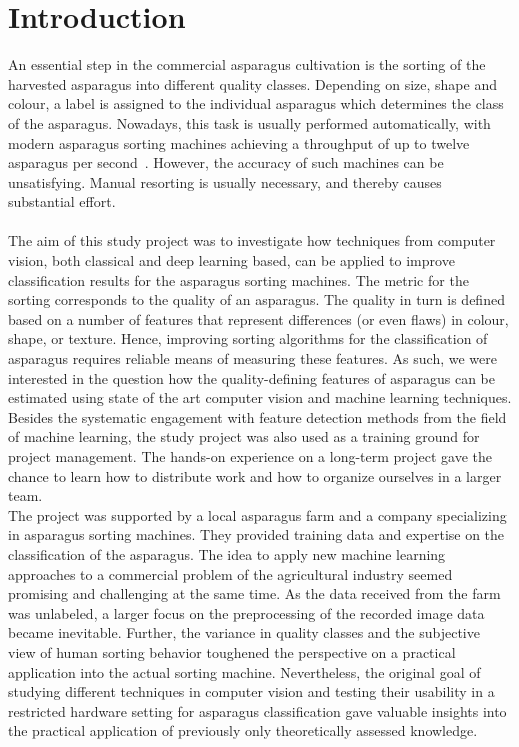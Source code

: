 \section{Introduction}
\label{ch:Introduction}

An essential step in the commercial asparagus cultivation is the sorting of the harvested asparagus into different quality classes. Depending on size, shape and colour, a label is assigned to the individual asparagus which determines the class of the asparagus. Nowadays, this task is usually performed automatically, with modern asparagus sorting machines achieving a throughput of up to twelve asparagus per second~\citep{ting2015zeitalter}. However, the accuracy of such machines can be unsatisfying. Manual resorting is usually necessary, and thereby causes substantial effort. \\
\\
The aim of this study project was to investigate how techniques from computer vision, both classical and deep learning based, can be applied to improve classification results for the asparagus sorting machines. The metric for the sorting corresponds to the quality of an asparagus. The quality in turn is defined based on a number of features that represent differences (or even flaws) in colour, shape, or texture. Hence, improving sorting algorithms for the classification of asparagus requires reliable means of measuring these features. As such, we were interested in the question how the quality-defining features of asparagus can be estimated using state of the art computer vision and machine learning techniques. \\
Besides the systematic engagement with feature detection methods from the field of machine learning, the study project was also used as a training ground for project management. The hands-on experience on a long-term project gave the chance to learn how to distribute work and how to organize ourselves in a larger team. \\
The project was supported by a local asparagus farm and a company specializing in asparagus sorting machines. They provided training data and expertise on the classification of the asparagus. The idea to apply new machine learning approaches to a commercial problem of the agricultural industry seemed promising and challenging at the same time. As the data received from the farm was unlabeled, a larger focus on the preprocessing of the recorded image data became inevitable. Further, the variance in quality classes and the subjective view of human sorting behavior toughened the perspective on a practical application into the actual sorting machine. Nevertheless, the original goal of studying different techniques in computer vision and testing their usability in a restricted hardware setting for asparagus classification gave valuable insights into the practical application of previously only theoretically assessed knowledge. \\
